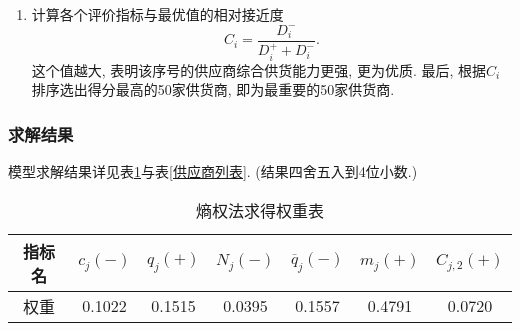 \documentclass[11pt, fontset = windows]{article}
\begin{document}
\begin{enumerate}
\begin{enumerate}
              \item 计算各个评价指标与最优值的相对接近度
                    \begin{equation}
                        C_i=\frac{D_i^-}{D_i^++D_i^-}.
                    \end{equation}
                    这个值越大, 表明该序号的供应商综合供货能力更强, 更为优质. 最后, 根据$C_i$排序选出得分最高的50家供货商, 即为最重要的50家供货商.

          \end{enumerate}

\end{enumerate}

\subsubsection[]{求解结果}

模型求解结果详见表\ref{权重列表}与表\ref{供应商列表}. (结果四舍五入到4位小数.)

\begin{table}[h]
    \centering
    \begin{tabular}{ccccccc}
        \toprule
        指标名 & $c_j (-)$ & $q_j (+)$ & $N_j (-)$ & $\overline{q}_j (-)$ & $m_j (+)$ & $C_{j,2} (+)$ \\ \midrule
        权重  & 0.1022    & 0.1515    & 0.0395    & 0.1557               & 0.4791    & 0.0720        \\ \bottomrule
    \end{tabular}
    \caption{熵权法求得权重表}
    \label{权重列表}
\end{table}
\end{document}
